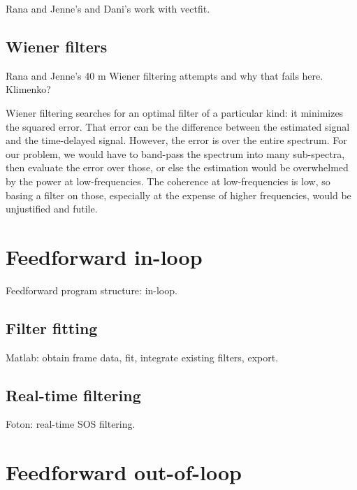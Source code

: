             Rana and Jenne's and Dani's work with vectfit.

        \subsection{Wiener filters}
        \label{wiener_filters}

            Rana and Jenne's 40 m Wiener filtering attempts and why that fails here. Klimenko?

            Wiener filtering searches for an optimal filter of a particular kind: it minimizes the squared error. That error can be the difference between the estimated signal and the time-delayed signal. However, the error is over the entire spectrum. For our problem, we would have to band-pass the spectrum into many sub-spectra, then evaluate the error over those, or else the estimation would be overwhelmed by the power at low-frequencies. The coherence at low-frequencies is low, so basing a filter on those, especially at the expense of higher frequencies, would be unjustified and futile.

    \section{Feedforward in-loop}
    \label{in-loop}

        Feedforward program structure: in-loop.

        \subsection{Filter fitting}
        \label{filter_fitting_in-loop}

            Matlab: obtain frame data, fit, integrate existing filters, export.

        \subsection{Real-time filtering}
        \label{real-time}
      
            Foton: real-time SOS filtering.

    \section{Feedforward out-of-loop}
    \label{out-of-loop}

